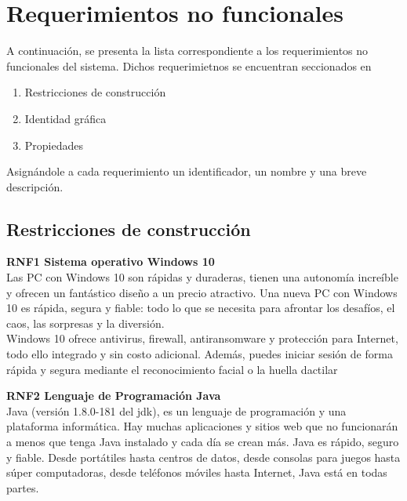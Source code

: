 \section{Requerimientos no funcionales}

A continuación, se presenta la lista correspondiente a los requerimientos no funcionales del sistema. Dichos requerimietnos se encuentran seccionados en 
\begin{enumerate}
	\item Restricciones de construcción
	\item Identidad gráfica
	\item Propiedades
\end{enumerate} 
Asignándole a cada requerimiento un identificador, un nombre y una breve descripción.\\

\subsection{Restricciones de construcción}

\textbf{RNF1 \hspace{2cm}Sistema operativo Windows 10}\\
Las PC con Windows 10 son rápidas y duraderas, tienen una autonomía increíble y ofrecen un fantástico diseño a un precio  atractivo.  Una nueva PC con Windows 10 es rápida, segura y fiable: todo lo que se necesita para afrontar los desafíos, el caos, las sorpresas y la diversión.\\Windows 10 ofrece antivirus, firewall, antiransomware y protección para Internet, todo ello integrado y sin costo adicional. Además, puedes iniciar sesión de forma rápida y segura mediante el reconocimiento facial o la huella dactilar

\textbf{RNF2 \hspace{2cm}Lenguaje de Programación Java}\\
Java (versión 1.8.0-181 del jdk), es un lenguaje de programación y una plataforma informática. Hay muchas aplicaciones y sitios web que no funcionarán a menos que tenga Java instalado y cada día se crean más. Java es rápido, seguro y fiable. Desde portátiles hasta centros de datos, desde consolas para juegos hasta súper computadoras, desde teléfonos móviles hasta Internet, Java está en todas partes.\\

